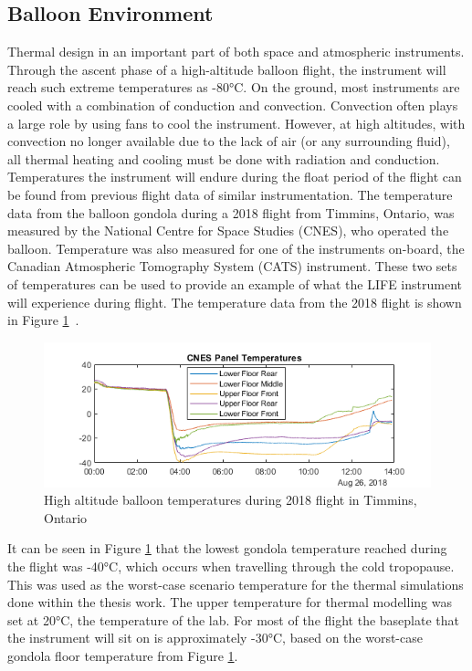 \subsection{Balloon Environment}
Thermal design in an important part of both space and atmospheric instruments. Through the ascent phase of a high-altitude balloon flight, the instrument will reach such extreme temperatures as -80°C. On the ground, most instruments are cooled with a combination of conduction and convection. Convection often plays a large role by using fans to cool the instrument. However, at high altitudes, with convection no longer available due to the lack of air (or any surrounding fluid), all thermal heating and cooling must be done with radiation and conduction. 
 Temperatures the instrument will endure during the float period of the flight can be found from previous flight data of similar instrumentation. The temperature data from the balloon gondola during a 2018 flight from Timmins, Ontario, was measured by the National Centre for Space Studies (CNES), who operated the balloon. Temperature was also measured for one of the instruments on-board, the Canadian Atmospheric Tomography System (CATS) instrument. These two sets of temperatures can be used to provide an example of what the LIFE instrument will experience during flight. The temperature data from the 2018 flight is shown in Figure \ref{fig:2018_timmins_temps}~\cite{CATS_report}. 
 
 \begin{figure}[h]
\centering
  \includegraphics{chap2_images/CNES_temps_CATS_2018.png}
  \caption{High altitude balloon temperatures during 2018 flight in Timmins, Ontario}
  \label{fig:2018_timmins_temps}
\end{figure}

It can be seen in Figure \ref{fig:2018_timmins_temps} that the lowest gondola temperature reached during the flight was -40°C, which occurs when travelling through the cold tropopause. This was used as the worst-case scenario temperature for the thermal simulations done within the thesis work. The upper temperature for thermal modelling was set at 20°C, the temperature of the lab. For most of the flight the baseplate that the instrument will sit on is approximately -30°C, based on the worst-case gondola floor temperature from Figure \ref{fig:2018_timmins_temps}. 

